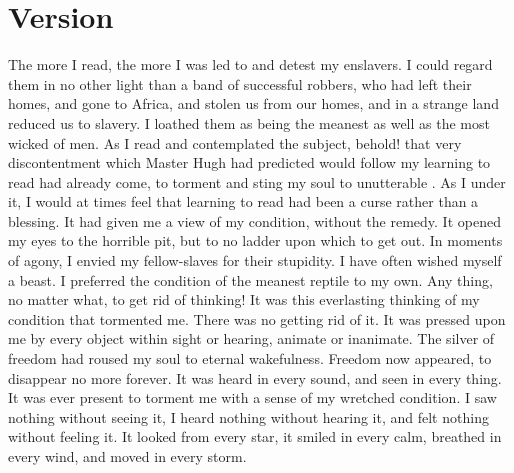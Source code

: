 \documentclass{fiche}
\begin{document}
\newpage
\section{Version}

\begin{version}
The more I read, the more I was led to  and detest my
enslavers. I could regard them in no other light than a band of successful robbers, who had
left their homes, and gone to Africa, and stolen us from our homes, and in a strange land
reduced us to slavery. I loathed them as being the meanest as well as the most wicked of men.
As I read and contemplated the subject, behold! that very discontentment which Master Hugh
had predicted would follow my learning to read had already come, to torment and sting my soul
to unutterable . As I
 under it, I would at times feel that learning
to read had been a curse rather than a blessing. It had given me a view of my
 condition, without the remedy. It opened my eyes to the
horrible pit, but to no ladder upon which to get out. In moments of agony, I envied my
fellow-slaves for their stupidity. I have often wished myself a beast. I preferred the
condition of the meanest reptile to my own. Any thing, no matter what, to get rid of
thinking! It was this everlasting thinking of my condition that tormented me. There was no
getting rid of it. It was pressed upon me by every object within sight or hearing, animate or
inanimate. The silver  of freedom
had roused my soul to eternal wakefulness. Freedom now appeared, to disappear no more
forever. It was heard in every sound, and seen in every thing. It was ever present to torment
me with a sense of my wretched condition. I saw nothing without seeing it, I heard nothing
without hearing it, and felt nothing without feeling it. It looked from every star, it smiled
in every calm, breathed in every wind, and moved in every storm.
\end{version}

\end{document}

